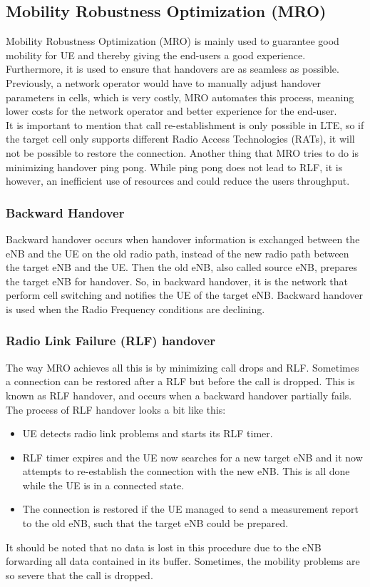 \documentclass{report}
\begin{document}
\subsection{Mobility Robustness Optimization (MRO)}
Mobility Robustness Optimization (MRO) is mainly used to guarantee good mobility for UE and thereby giving the end-users a good experience. Furthermore, it is used to ensure that handovers are as seamless as possible. Previously, a network operator would have to manually adjust handover parameters in cells, which is very costly, MRO automates this process, meaning lower costs for the network operator and better experience for the end-user. \\ It is important to mention that call re-establishment is only possible in LTE, so if the target cell only supports different Radio Access Technologies (RATs), it will not be possible to restore the connection. 
Another thing that MRO tries to do is minimizing handover ping pong. While ping pong does not lead to RLF, it is however, an inefficient use of resources and could reduce the users throughput. 

\subsubsection{Backward Handover}
Backward handover occurs when handover information is exchanged between the eNB and the UE on the old radio path, instead of the new radio path between the target eNB and the UE. Then the old eNB, also called source eNB, prepares the target eNB for handover. So, in backward handover, it is the network that perform cell switching and notifies the UE of the target eNB. 
Backward handover is used when the Radio Frequency conditions are declining.

\subsubsection{Radio Link Failure (RLF) handover}
The way MRO achieves all this is by minimizing call drops and RLF. Sometimes a connection can be restored after a RLF but before the call is dropped. This is known as RLF handover, and occurs when a backward handover partially fails. The process of RLF handover looks a bit like this: 
\begin{itemize}
	\item UE detects radio link problems and starts its RLF timer.
	\item RLF timer expires and the UE now searches for a new target eNB and it now attempts to re-establish the connection with the new eNB. This is all done while the UE is in a connected state. 
	\item The connection is restored if the UE managed to send a measurement report to the old eNB, such that the target eNB could be prepared.  %
\end{itemize}
It should be noted that no data is lost in this procedure due to the eNB forwarding all data contained in its buffer. 
Sometimes, the mobility problems are so severe that the call is dropped. 
\end{document}
